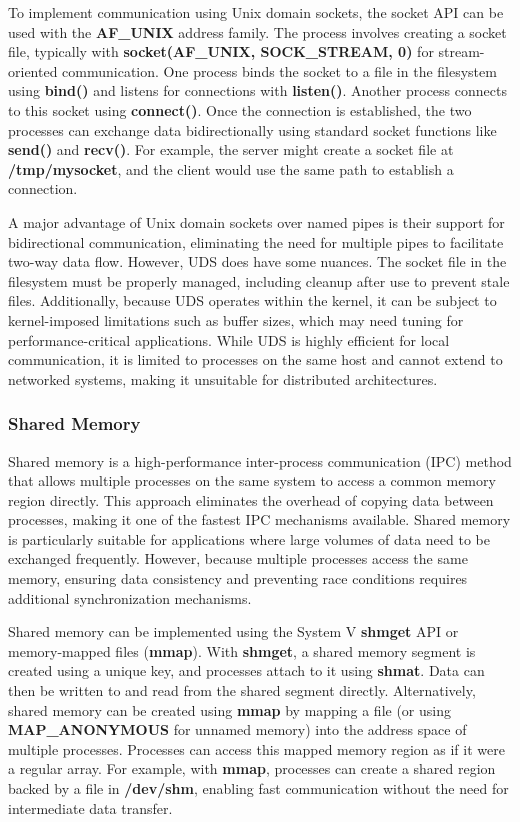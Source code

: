 \documentclass[letterpaper,twocolumn,10pt]{article}
\begin{document}
To implement communication using Unix domain sockets, the socket API can be used with the \textbf{AF\_UNIX} address family.
The process involves creating a socket file, typically with \textbf{socket(AF\_UNIX, SOCK\_STREAM, 0)} for stream-oriented communication.
One process binds the socket to a file in the filesystem using \textbf{bind()} and listens for connections with \textbf{listen()}.
Another process connects to this socket using \textbf{connect()}.
Once the connection is established, the two processes can exchange data bidirectionally using standard socket functions like \textbf{send()} and \textbf{recv()}.
For example, the server might create a socket file at \textbf{/tmp/mysocket}, and the client would use the same path to establish a connection.

A major advantage of Unix domain sockets over named pipes is their support for bidirectional communication, eliminating the need for multiple pipes to facilitate two-way data flow.
However, UDS does have some nuances.
The socket file in the filesystem must be properly managed, including cleanup after use to prevent stale files.
Additionally, because UDS operates within the kernel, it can be subject to kernel-imposed limitations such as buffer sizes, which may need tuning for performance-critical applications.
While UDS is highly efficient for local communication, it is limited to processes on the same host and cannot extend to networked systems, making it unsuitable for distributed architectures.

\subsubsection{Shared Memory}
Shared memory is a high-performance inter-process communication (IPC) method that allows multiple processes on the same system to access a common memory region directly.
This approach eliminates the overhead of copying data between processes, making it one of the fastest IPC mechanisms available.
Shared memory is particularly suitable for applications where large volumes of data need to be exchanged frequently.
However, because multiple processes access the same memory, ensuring data consistency and preventing race conditions requires additional synchronization mechanisms.

Shared memory can be implemented using the System V \textbf{shmget} API or memory-mapped files (\textbf{mmap}).
With \textbf{shmget}, a shared memory segment is created using a unique key, and processes attach to it using \textbf{shmat}.
Data can then be written to and read from the shared segment directly.
Alternatively, shared memory can be created using \textbf{mmap} by mapping a file (or using \textbf{MAP\_ANONYMOUS} for unnamed memory) into the address space of multiple processes.
Processes can access this mapped memory region as if it were a regular array.
For example, with \textbf{mmap}, processes can create a shared region backed by a file in \textbf{/dev/shm}, enabling fast communication without the need for intermediate data transfer.
\end{document}
